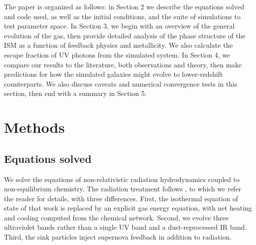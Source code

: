\documentclass[twocolumn,linenumbers]{aastex631}
\begin{document}
The paper is organized as follows: in Section 2 we describe the equations solved and code used, as well as the initial conditions, and the suite of simulations to test parameter space. In Section 3, we begin with an overview of the general evolution of the gas, then provide detailed analysis of the phase structure of the ISM as a function of feedback physics and metallicity. We also calculate the escape fraction of UV photons from the simulated system. In Section 4, we compare our results to the literature, both observations and theory, then make predictions for how the simulated galaxies might evolve to lower-redshift counterparts. We also discuss caveats and numerical convergence tests in this section, then end with a summary in Section 5.


\section{Methods}
\subsection{Equations solved}
We solve the equations of non-relativistic radiation hydrodynamics coupled to non-equilibrium chemistry. The radiation treatment follows \citet{2023MNRAS.521.5160M}, to which we refer the reader for details, with three differences. First, the isothermal equation of state of that work is replaced by an explicit gas energy equation, with net heating and cooling computed from the chemical network. Second, we evolve three ultraviolet bands rather than a single UV band and a dust-reprocessed IR band. Third, the sink particles inject supernova feedback in addition to radiation.
\end{document}

